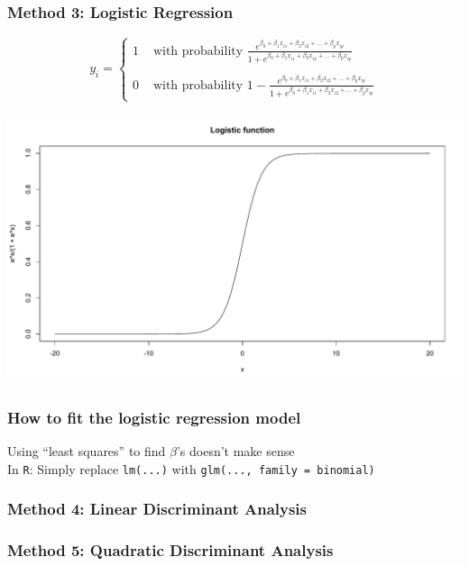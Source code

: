 \documentclass{beamer}
\begin{document}
\begin{frame}
\frametitle{Method 3: Logistic Regression}
$$y_i = \left\{\begin{array}{ll}
	1	& \mbox{ with probability }\frac{e^{\beta_0 + \beta_1 x_{i1} + \beta_2 x_{i2} + ... + \beta_p x_{ip}}}{1 + e^{\beta_0 + \beta_1 x_{i1} + \beta_2 x_{i2} + ... + \beta_p x_{ip}}}\\\\
	0	& \mbox{ with probability }1 - \frac{e^{\beta_0 + \beta_1 x_{i1} + \beta_2 x_{i2} + ... + \beta_p x_{ip}}}{1 + e^{\beta_0 + \beta_1 x_{i1} + \beta_2 x_{i2} + ... + \beta_p x_{ip}}}
\end{array}\right.$$
\begin{center}
\includegraphics[scale = 0.3]{logistic.pdf}
\end{center}
\end{frame}

\begin{frame}
\frametitle{How to fit the logistic regression model}
Using ``least squares'' to find $\beta$'s doesn't make sense\\
{\small In {\tt R}: Simply replace {\tt lm(...)} with {\tt glm(..., family = binomial)}}
\end{frame}

\begin{frame}
\frametitle{Method 4: Linear Discriminant Analysis}
\end{frame}

\begin{frame}
\frametitle{Method 5: Quadratic Discriminant Analysis}
\end{frame}
\end{document}
